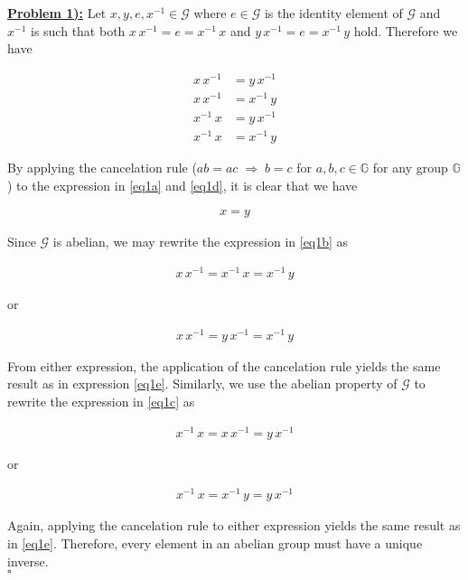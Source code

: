 \documentclass{article}[12]
\numberwithin{equation}{section}
\newcommand{\numbpr}[1]{\setcounter{section}{#1} \setcounter{equation}{0}}
\newcommand{\prob}[1]{\textbf{\underline{Problem #1):}}}
\begin{document}
\begin{flushleft}



\numbpr{1}
\prob{1} Let $x, y, e, x^{-1} \in \mathcal{G}$ where $e \in \mathcal{G}$ is the identity element of $\mathcal{G}$ and $x^{-1}$ is such that both $x \, x^{-1} = e = x^{-1} \, x$ and $y \, x^{-1} = e = x^{-1} \, y$ hold.  Therefore we have 

\begin{align}
  x \, x^{-1} &= y \, x^{-1} \label{eq1a} \\
  x \, x^{-1} &= x^{-1} \, y \label{eq1b} \\
  x^{-1} \, x &= y \, x^{-1} \label{eq1c} \\
  x^{-1} \, x &= x^{-1} \, y \label{eq1d} 
\end{align}

By applying the cancelation rule ($a b = a c \; \Rightarrow \; b = c$ for $a, b, c \in \mathbb{G}$ for any group $\mathbb{G}$) to the expression in \ref{eq1a} and \ref{eq1d}, it is clear that we have

\begin{align}
  x = y \label{eq1e}
\end{align}

Since $\mathcal{G}$ is abelian, we may rewrite the expression in \ref{eq1b} as

\begin{align*}
  x \, x^{-1} = x^{-1} \, x = x^{-1} \, y
\end{align*}

or

\begin{align*}
  x \, x^{-1} = y \, x^{-1} = x^{-1} \, y
\end{align*}

From either expression, the application of the cancelation rule yields the same result as in expression \ref{eq1e}.  Similarly, we use the abelian property of $\mathcal{G}$ to rewrite the expression in \ref{eq1c} as

\begin{align*}
  x^{-1} \, x = x \, x^{-1} = y \, x^{-1}
\end{align*}

or

\begin{align*}
  x^{-1} \, x = x^{-1} \, y = y \, x^{-1}
\end{align*}

Again, applying the cancelation rule to either expression yields the same result as in \ref{eq1e}.  Therefore, every element in an abelian group must have a unique inverse. \\
$\square$




\end{flushleft}
\end{document}
